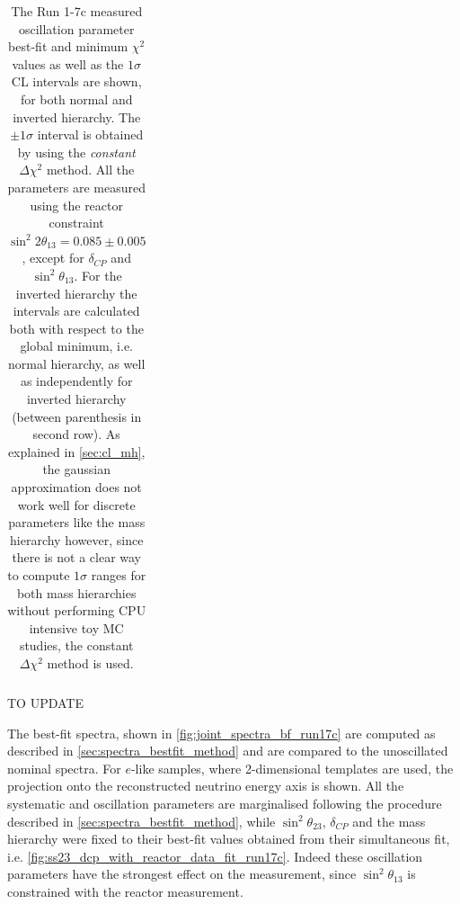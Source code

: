 \begin{table}[htb]
\begin{tabular}{| c | c || c | c | c || c | c | c |}
\hline
\end{tabular}
\caption{
The Run 1-7c measured oscillation parameter best-fit
and minimum $\chi^2$ 
values  
as well as the 
$1\sigma$ 
CL intervals are shown,
for both normal and inverted hierarchy. 
The $\pm1\sigma$ interval is obtained by using the 
\emph{constant} $\Delta \chi^2$ method.
All the parameters are measured using the reactor constraint 
$\sin^2 2\theta_{13} = 0.085 \pm 0.005 $
\cite{pdg_2014},
except for $\delta_{CP}$ and $\sin^2 \theta_{13}$.
For the inverted hierarchy the intervals are calculated both with respect to 
the global minimum, i.e. normal hierarchy, as well as 
independently for inverted hierarchy (between parenthesis in second row).
As explained in \cref{sec:cl_mh}, the gaussian approximation does not work well 
for discrete parameters like the mass hierarchy however, since there is not a clear way
to compute $1\sigma$ ranges for both mass hierarchies without performing
CPU intensive toy MC studies, the constant $\Delta \chi^2$ method is used.
}                                                                                                                                                                                          
\label{tab:joint_bestfit_run17c}
\end{table}






{\huge{TO UPDATE}}

The best-fit spectra, shown in \cref{fig:joint_spectra_bf_run17c} are computed as described in \cref{sec:spectra_bestfit_method}
and are compared to the unoscillated nominal spectra.
For $e$-like samples, where 2-dimensional templates are used,
the projection onto the reconstructed neutrino energy axis is shown.
All the systematic and oscillation parameters are marginalised following the procedure described in \cref{sec:spectra_bestfit_method},
while $\sin^2\theta_{23}$, $\delta_{CP}$ and the mass hierarchy were fixed to their best-fit values 
obtained from their simultaneous fit, i.e. \cref{fig:ss23_dcp_with_reactor_data_fit_run17c}.
Indeed these oscillation parameters have the strongest effect on the measurement,
since $\sin^2\theta_{13}$ is constrained with the reactor measurement.


